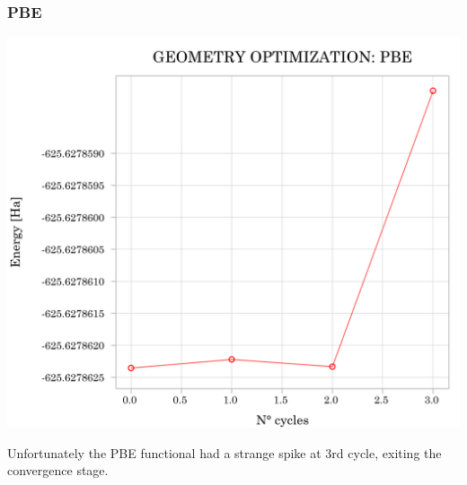 \documentclass{article}
\begin{document}
\subsubsection{PBE}
\noindent\begin{minipage}[t]{0.55\textwidth}
	\vspace{-\topskip}
	\includegraphics[width=1\textwidth]{../images/PBE.png}
	\label{fig:opt_PBE}
\end{minipage}
\hfill
\begin{minipage}[t]{0.4\textwidth}
	\vspace{-\topskip}
	\vspace{20pt}
	Unfortunately the PBE functional had a strange spike at 3rd cycle, exiting the convergence stage. 
\end{minipage}
\end{document}
